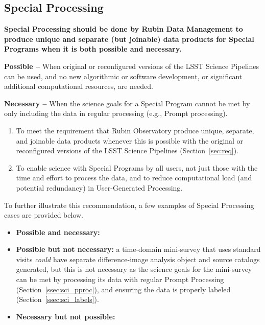 \subsection{Special Processing}\label{ssec:sci_sproc}

\textbf{Special Processing should be done by Rubin Data Management to 
produce unique and separate (but joinable) data products
for Special Programs when it is both possible and necessary.}

\textbf{Possible -- } When original or reconfigured versions of the LSST
Science Pipelines can be used, and no new algorithmic or software development,
or significant additional computational resources, are needed.

\textbf{Necessary -- } When the science goals for a Special Program cannot
be met by only including the data in regular processing (e.g., Prompt processing).

\begin{enumerate}

\item To meet the requirement that Rubin Observatory produce
unique, separate, and joinable data products whenever this is possible 
with the original or reconfigured versions of the LSST Science Pipelines
(Section~\ref{sec:req}).

\item To enable science with Special Programs by all users, not just those
with the time and effort to process the data, and to reduce computational
load (and potential redundancy) in User-Generated Processing.

\end{enumerate}

To further illustrate this recommendation, a few examples of Special Processing
cases are provided below.

\begin{itemize}

\item \textbf{Possible and necessary:}

\item \textbf{Possible but not necessary:}
a time-domain mini-survey that uses standard visits \emph{could}
have separate difference-image analysis object and source catalogs
generated, but this is not necessary as the science goals for the
mini-survey can be met by processing its data with regular Prompt
Processing (Section~\ref{ssec:sci_pproc}), and ensuring the
data is properly labeled (Section~\ref{ssec:sci_labels}).

\item \textbf{Necessary but not possible:}

\end{itemize}


